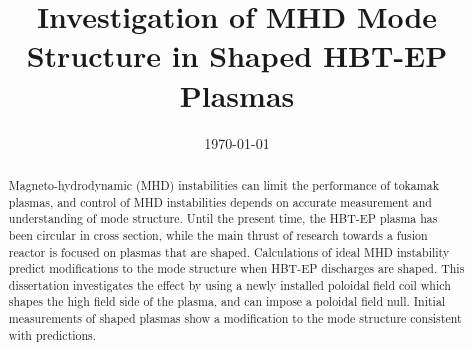 \documentclass[aps,prl,twocolumn,superscriptaddress,groupedaddress]{revtex4}  %
\begin{document}
\widetext
{}


\title{Investigation of MHD Mode Structure in Shaped HBT-EP Plasmas}

\date{\today}


\begin{abstract}
Magneto-hydrodynamic (MHD) instabilities can limit the performance of tokamak plasmas, and control of MHD instabilities depends on accurate measurement and understanding of mode structure.  Until the present time, the HBT-EP plasma has been circular in cross section, while the main thrust of research towards a fusion reactor is focused on plasmas that are shaped.  Calculations of ideal MHD instability predict modifications to the mode structure when HBT-EP discharges are shaped\cite{Maurer}.  This dissertation investigates the effect by using a newly installed poloidal field coil which shapes the high field side of the plasma, and can impose a poloidal field null.  Initial measurements of shaped plasmas show a modification to the mode structure consistent with predictions.
\end{abstract}

\maketitle
\end{document}
